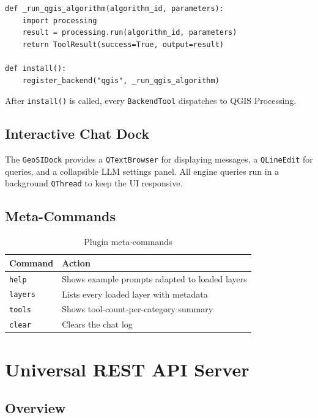 \documentclass[12pt,a4paper]{report}
\begin{document}
\begin{lstlisting}
def _run_qgis_algorithm(algorithm_id, parameters):
    import processing
    result = processing.run(algorithm_id, parameters)
    return ToolResult(success=True, output=result)

def install():
    register_backend("qgis", _run_qgis_algorithm)
\end{lstlisting}

After \texttt{install()} is called, every \texttt{BackendTool} dispatches to QGIS Processing.

\section{Interactive Chat Dock}

The \texttt{GeoSIDock} provides a \texttt{QTextBrowser} for displaying messages, a \texttt{QLineEdit} for queries, and a collapsible LLM settings panel.  All engine queries run in a background \texttt{QThread} to keep the UI responsive.

\section{Meta-Commands}

\begin{table}[ht]
\centering
\caption{Plugin meta-commands}
\begin{tabular}{ll}
\toprule
\textbf{Command} & \textbf{Action} \\
\midrule
\texttt{help}   & Shows example prompts adapted to loaded layers \\
\texttt{layers} & Lists every loaded layer with metadata \\
\texttt{tools}  & Shows tool-count-per-category summary \\
\texttt{clear}  & Clears the chat log \\
\bottomrule
\end{tabular}
\end{table}

\chapter{Universal REST API Server}

\section{Overview}
\end{document}
